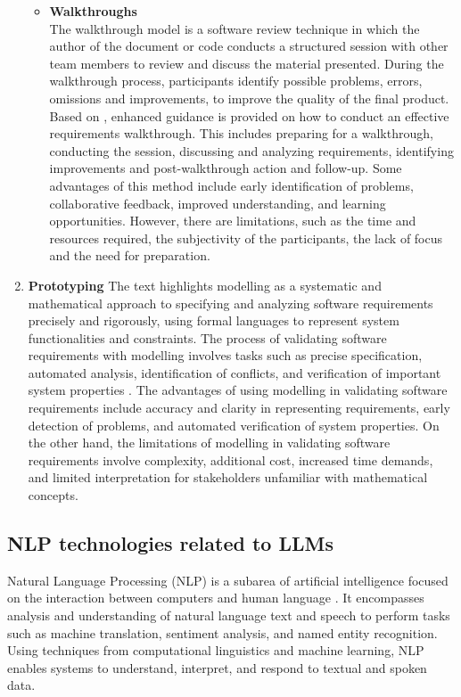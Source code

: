 \begin{enumerate}
\begin{itemize}
    \item \textbf{Walkthroughs}\\
 The walkthrough model is a software review technique in which the author of the document or code conducts a structured session with other team members to review and discuss the material presented. During the walkthrough process, participants identify possible problems, errors, omissions and improvements, to improve the quality of the final product. Based on \cite{Wiegers2013}, enhanced guidance is provided on how to conduct an effective requirements walkthrough. This includes preparing for a walkthrough, conducting the session, discussing and analyzing requirements, identifying improvements and post-walkthrough action and follow-up. Some advantages of this method include early identification of problems, collaborative feedback, improved understanding, and learning opportunities. However, there are limitations, such as the time and resources required, the subjectivity of the participants, the lack of focus and the need for preparation.
\end{itemize}
\item \textbf{Prototyping}
 The text highlights modelling as a systematic and mathematical approach to specifying and analyzing software requirements precisely and rigorously, using formal languages to represent system functionalities and constraints. The process of validating software requirements with modelling involves tasks such as precise specification, automated analysis, identification of conflicts, and verification of important system properties \cite{Wiegers2013}. The advantages of using modelling in validating software requirements include accuracy and clarity in representing requirements, early detection of problems, and automated verification of system properties. On the other hand, the limitations of modelling in validating software requirements involve complexity, additional cost, increased time demands, and limited interpretation for stakeholders unfamiliar with mathematical concepts.
\end{enumerate}
\subsection{NLP technologies related to LLMs}
Natural Language Processing (NLP) is a subarea of artificial intelligence focused on the interaction between computers and human language \cite{eisenstein2019}. It encompasses analysis and understanding of natural language text and speech to perform tasks such as machine translation, sentiment analysis, and named entity recognition. Using techniques from computational linguistics and machine learning, NLP enables systems to understand, interpret, and respond to textual and spoken data.

